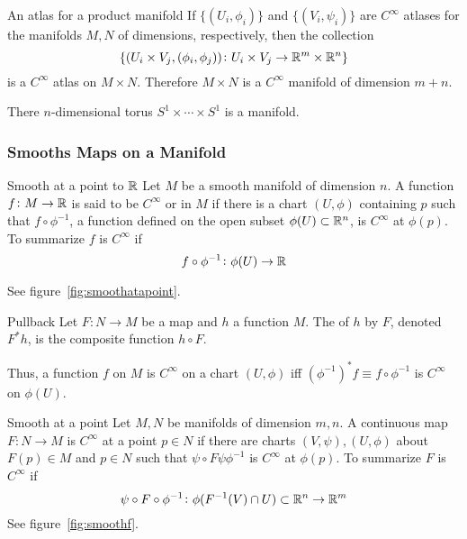 \begin{proposition}{An atlas for a product manifold}{}
    If \(\{(U_i, \phi_i)\}\) and \(\{(V_i, \psi_i)\}\) are \(C^\infty\) atlases for the manifolds \(M,N\) of dimensions, respectively, then the collection
    \begin{equation}
        \{ (U_i \times V_j, (\phi_i, \phi_j)) \colon U_i \times V_j \rightarrow \mathbb{R}^m \times \mathbb{R}^n \}
    \end{equation}
    is a \(C^\infty\) atlas on \(M \times N\). Therefore \(M \times N\) is a \(C^\infty\) manifold of dimension \(m+n\).
\end{proposition}

There \(n\)-dimensional torus \(S^1 \times \cdots \times S^1\) is a manifold.

\subsubsection{Smooths Maps on a Manifold}

\begin{definition}{Smooth at a point to \(\mathbb{R}\)}{}
    Let \(M\) be a smooth manifold of dimension \(n\). A function \(f\colon M \rightarrow \mathbb{R}\) is said to be \(C^\infty\) or  in \(M\) if there is a chart \((U, \phi)\) containing \(p\) such that \(f \circ \phi^{-1}\), a function defined on the open subset \(\phi(U) \subset \mathbb{R}^n\), is \(C^\infty\) at \(\phi(p)\).
    To summarize \(f\) is \(C^\infty\) if
    \[
        f \circ \phi^{-1} \colon \phi(U) \rightarrow \mathbb{R}
    \]

    See figure~\ref{fig:smoothatapoint}.
\end{definition}
\begin{definition}{Pullback}{}
    Let \(F \colon N \rightarrow M\) be a map and \(h\) a function \(M\).
    The  of \(h\) by \(F\), denoted \(F^*h\), is the composite function \(h \circ F\).
\end{definition}

Thus, a function \(f\) on \(M\) is \(C^\infty\) on a chart \((U, \phi)\) iff \((\phi^{-1})^* f \equiv f \circ \phi^{-1}\) is \(C^\infty\) on \(\phi(U)\).

\begin{definition}{Smooth at a point}{}
    Let \(M,N\) be manifolds of dimension \(m,n\). A continuous map \(F\colon N \rightarrow M\) is \(C^\infty\) at a point \(p \in N\) if there are charts \((V, \psi), (U, \phi)\) about \(F(p) \in M\) and \(p \in N\) such that \(\psi \circ F \psi \phi^{-1}\) is \(C^\infty\) at \(\phi(p)\).
    To summarize \(F\) is \(C^\infty\) if
    \[
        \psi \circ F \circ \phi^{-1} \colon \phi(F^{-1}(V) \cap U) \subset \mathbb{R}^n \rightarrow \mathbb{R}^m
    \]
    See figure~\ref{fig:smoothf}.
\end{definition}

